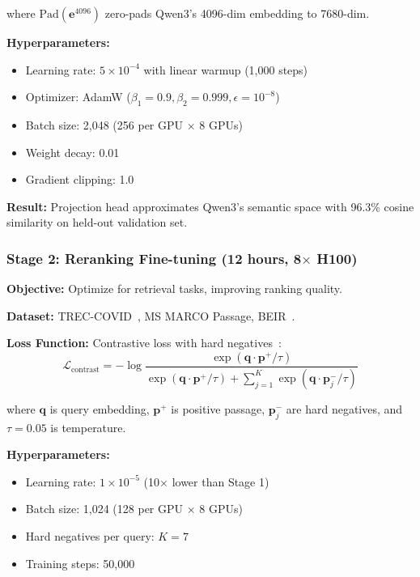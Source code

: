 \documentclass[11pt,a4paper]{article}
\begin{document}
where $\text{Pad}(\mathbf{e}^{4096})$ zero-pads Qwen3's 4096-dim embedding to 7680-dim.

\textbf{Hyperparameters:}
\begin{itemize}
\item Learning rate: $5 \times 10^{-4}$ with linear warmup (1,000 steps)
\item Optimizer: AdamW ($\beta_1=0.9, \beta_2=0.999, \epsilon=10^{-8}$)
\item Batch size: 2,048 (256 per GPU $\times$ 8 GPUs)
\item Weight decay: 0.01
\item Gradient clipping: 1.0
\end{itemize}

\textbf{Result:} Projection head approximates Qwen3's semantic space with 96.3\% cosine similarity on held-out validation set.

\subsubsection{Stage 2: Reranking Fine-tuning (12 hours, 8$\times$ H100)}

\textbf{Objective:} Optimize for retrieval tasks, improving ranking quality.

\textbf{Dataset:} TREC-COVID~\cite{voorhees2020trec}, MS MARCO Passage, BEIR~\cite{thakur2021beir}.

\textbf{Loss Function:} Contrastive loss with hard negatives~\cite{karpukhin2020dpr}:
\begin{equation}
\mathcal{L}_{\text{contrast}} = -\log \frac{\exp(\mathbf{q} \cdot \mathbf{p}^+ / \tau)}{\exp(\mathbf{q} \cdot \mathbf{p}^+ / \tau) + \sum_{j=1}^{K} \exp(\mathbf{q} \cdot \mathbf{p}_j^- / \tau)}
\end{equation}

where $\mathbf{q}$ is query embedding, $\mathbf{p}^+$ is positive passage, $\mathbf{p}_j^-$ are hard negatives, and $\tau=0.05$ is temperature.

\textbf{Hyperparameters:}
\begin{itemize}
\item Learning rate: $1 \times 10^{-5}$ (10$\times$ lower than Stage 1)
\item Batch size: 1,024 (128 per GPU $\times$ 8 GPUs)
\item Hard negatives per query: $K=7$
\item Training steps: 50,000
\end{itemize}
\end{document}
